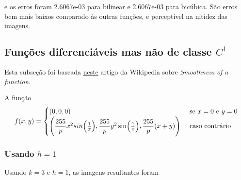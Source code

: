 \documentclass{article}
\begin{document}
e os erros foram 2.6067e-03 para bilinear e 2.6067e-03 para bicúbica.
São erros bem mais baixos comparado às outras funções, e perceptível na
nitidez das imagens.

\subsection[Funções diferenciáveis mas não de classe C1]{Funções diferenciáveis mas não de classe $C^1$}

Esta subseção foi baseada \href{https://en.wikipedia.org/wiki/Smoothness}{neste}
artigo da Wikipedia sobre \textit{Smoothness of a function}.

A função
\begin{equation}
  f(x,y) = \begin{cases}
  (0, 0, 0) & \mbox{ se } x = 0 \mbox{ e } y = 0 \\
  \Biggl(
    \dfrac{255}{p} x^2 sin\Bigl(\frac{1}{x}\Bigr)
  , \dfrac{255}{p} y^2 \sin \Bigl( \frac{1}{x} \Bigr)
  , \dfrac{255}{p} (x+y)
  \Biggr) &\text{ caso contrário}
  \end{cases}
\end{equation}

\subsubsection[Usando h=1]{Usando $h=1$}

Usando $k=3$ e $h=1$, as imagens resultantes foram
\end{document}
